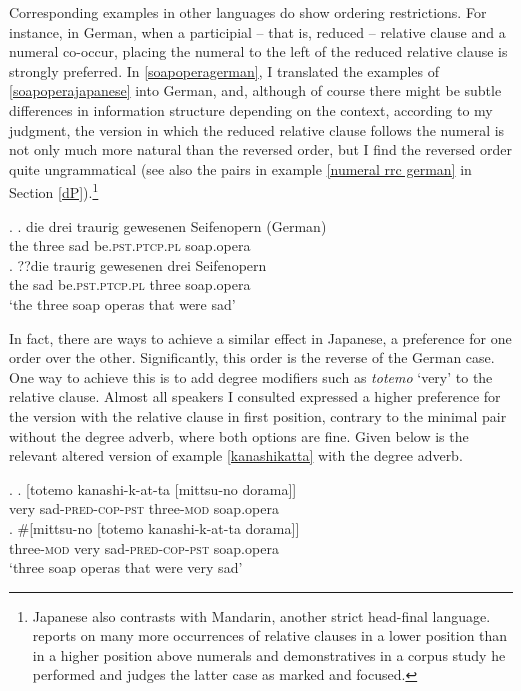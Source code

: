 Corresponding examples in other languages do show ordering restrictions. For instance, in  German, when a participial -- that is, reduced -- relative clause and a numeral co-occur, placing the numeral to the left of the reduced relative clause is strongly preferred. In \ref{soapoperagerman}, I translated the examples of \ref{soapoperajapanese} into German, and, although of course there might be subtle differences in information structure depending on the context, according to my judgment, the version in which the reduced relative clause follows the numeral is not only much more natural than the reversed order, but I find the reversed order quite ungrammatical (see also the pairs in example \ref{numeral rrc german} in Section \ref{dP}).\footnote{Japanese also contrasts with Mandarin, another strict head-final language. \citet{hsu:2017:alternatives} reports on many more occurrences of relative clauses in a lower position than in a higher position above numerals and demonstratives in a corpus study he performed and judges the latter case as marked and focused.}

\ex. \ag. die drei traurig gewesenen Seifenopern (German)\\
the three sad be.\textsc{pst.ptcp.pl} soap.opera\\
\bg. ??die traurig gewesenen drei Seifenopern \\
the sad be.\textsc{pst.ptcp.pl} three soap.opera\\
`the three soap operas that were sad' \label{soapoperagerman}

In fact, there are ways to achieve a similar effect in Japanese, a preference for one order over the other. Significantly, this order is the reverse of the  German case. One way to achieve this is to add degree modifiers such as \textit{totemo} `very’ to the relative clause. Almost all speakers I consulted expressed a higher preference for the version with the relative clause in first position, contrary to the minimal pair without the degree adverb, where both options are fine. Given below is the relevant altered version of example \ref{kanashikatta} with the degree adverb. 

\ex. \label{dorama} \ag. [totemo kanashi-k-at-ta [mittsu-no dorama]]\\
very sad-\textsc{pred-cop-pst} three-\textsc{mod} soap.opera\\
\bg. \#[mittsu-no [totemo kanashi-k-at-ta dorama]]\\
three-\textsc{mod} very sad-\textsc{pred-cop-pst} soap.opera\\
`three soap operas that were very sad'

